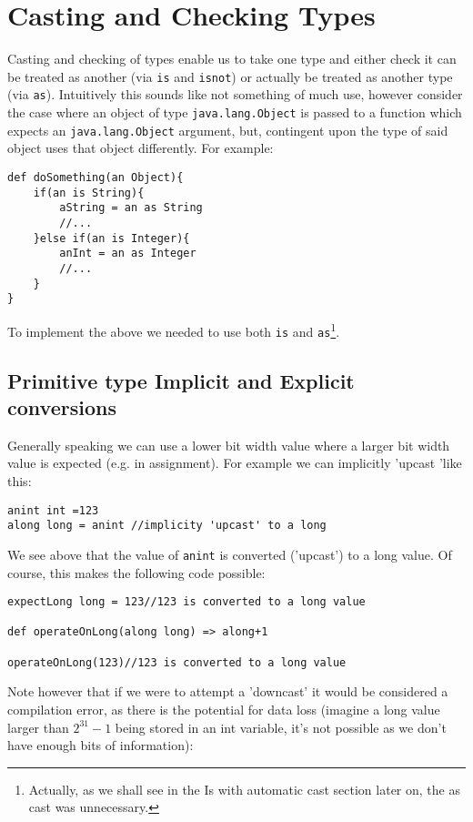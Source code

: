 \documentclass[conc-doc]{subfiles}
\begin{document}
	\chapter[Casting and Checking Types]{Casting and Checking Types}
	\label{ch:castAndcheck}
Casting and checking of types enable us to take one type and either check it can be treated as another (via \lstinline{is} and \lstinline{isnot}) or actually be treated as another type (via \lstinline{as}). Intuitively this sounds like not something of much use, however consider the case where an object of type \lstinline{java.lang.Object} is passed to a function which expects an \lstinline{java.lang.Object} argument, but, contingent upon the type of said object uses that object differently. For example:

\begin{lstlisting}
def doSomething(an Object){
	if(an is String){
		aString = an as String
		//...
	}else if(an is Integer){
		anInt = an as Integer
		//...
	}
}
\end{lstlisting}

To implement the above we needed to use both \lstinline{is} and \lstinline{as}\footnote{Actually, as we shall see in the Is with automatic cast section later on, the as cast was unnecessary.}.

\section{Primitive type Implicit and Explicit conversions}
Generally speaking we can use a lower bit width value where a larger bit width value is expected (e.g. in assignment). For example we can implicitly 'upcast 'like this:

\begin{lstlisting}
anint int =123
along long = anint //implicity 'upcast' to a long
\end{lstlisting}

We see above that the value of \lstinline{anint} is converted ('upcast') to a long value. Of course, this makes the following code possible:

\begin{lstlisting}
expectLong long = 123//123 is converted to a long value

def operateOnLong(along long) => along+1

operateOnLong(123)//123 is converted to a long value
\end{lstlisting}

Note however that if we were to attempt a 'downcast' it would be considered a compilation error, as there is the potential for data loss (imagine a long value larger than $2^{31} - 1$ being stored in an int variable, it's not possible as we don't have enough bits of information):
\end{document}
